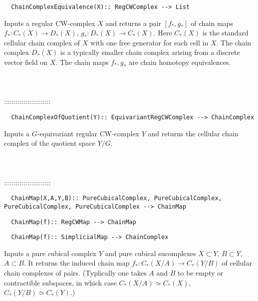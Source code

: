 \documentclass[a4paper,11pt]{report}
\begin{document}
{\begin{verbatim}  ChainComplexEquivalence(X):: RegCWComplex --> List
\end{verbatim}


 

 Inputs a regular CW-complex $X$ and returns a pair $[f_\ast, g_\ast]$ of chain maps $f_\ast\colon C_\ast(X) \rightarrow D_\ast(X)$, $g_\ast\colon D_\ast(X) \rightarrow C_\ast(X)$. Here $C_\ast(X)$ is the standard cellular chain complex of $X$ with one free generator for each cell in $X$. The chain complex $D_\ast(X)$ is a typically smaller chain complex arising from a discrete vector field on $X$. The chain maps $f_\ast, g_\ast$ are chain homotopy equivalences. \\
 \\
 \\
 \\
 ::::::::::::::::::::::::\\
 
\begin{verbatim}  ChainComplexOfQuotient(Y):: EquivariantRegCWComplex --> ChainComplex
\end{verbatim}


 

 Inputs a $G$-equivariant regular CW-complex $Y$ and returns the cellular chain complex of the quotient space $Y/G$. \\
 \\
 \\
 \\
 ::::::::::::::::::::::::\\
 
\begin{verbatim}  ChainMap(X,A,Y,B):: PureCubicalComplex, PureCubicalComplex, PureCubicalComplex, PureCubicalComplex --> ChainMap
\end{verbatim}
 
\begin{verbatim}  ChainMap(f):: RegCWMap --> ChainMap
\end{verbatim}
 
\begin{verbatim}  ChainMap(f):: SimplicialMap --> ChainComplex
\end{verbatim}


 

Inputs a pure cubical complex $Y$ and pure cubical sucomplexes $X\subset Y$, $B\subset Y$,$A\subset B$. It returns the induced chain map $f_\ast\colon C_\ast(X/A) \rightarrow C_\ast(Y/B)$ of cellular chain complexes of pairs. (Typlically one takes $A$ and $B$ to be empty or contractible subspaces, in which case $C_\ast(X/A) \simeq C_\ast(X)$, $C_\ast(Y/B) \simeq C_\ast(Y)$.) 

}
\end{document}
